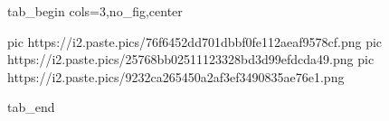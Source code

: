  
 
 
 
 


\ifcmt
  tab_begin cols=3,no_fig,center

     pic https://i2.paste.pics/76f6452dd701dbbf0fe112aeaf9578cf.png
		 pic https://i2.paste.pics/25768bb02511123328bd3d99efdcda49.png
		 pic https://i2.paste.pics/9232ca265450a2af3ef3490835ae76e1.png

  tab_end
\fi
